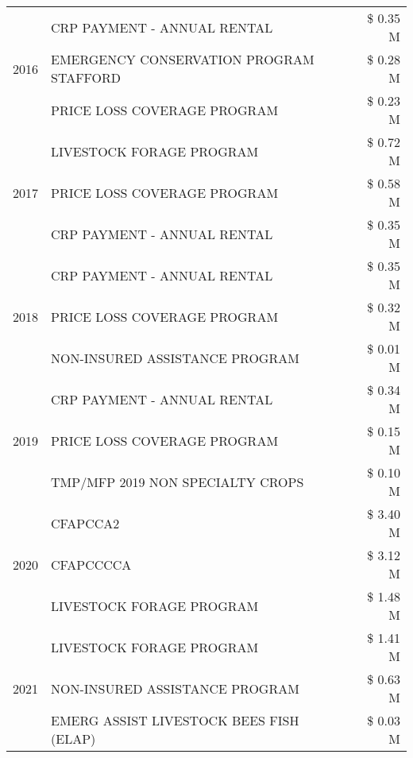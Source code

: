 \begin{tabular}{llr}
\cline{1-3}
\multirow[t]{3}{*}{2016} & CRP PAYMENT - ANNUAL RENTAL & \$ 0.35 M \\
 & EMERGENCY CONSERVATION PROGRAM STAFFORD & \$ 0.28 M \\
 & PRICE LOSS COVERAGE PROGRAM & \$ 0.23 M \\
\cline{1-3}
\multirow[t]{3}{*}{2017} & LIVESTOCK FORAGE PROGRAM & \$ 0.72 M \\
 & PRICE LOSS COVERAGE PROGRAM & \$ 0.58 M \\
 & CRP PAYMENT - ANNUAL RENTAL & \$ 0.35 M \\
\cline{1-3}
\multirow[t]{3}{*}{2018} & CRP PAYMENT - ANNUAL RENTAL & \$ 0.35 M \\
 & PRICE LOSS COVERAGE PROGRAM & \$ 0.32 M \\
 & NON-INSURED ASSISTANCE PROGRAM & \$ 0.01 M \\
\cline{1-3}
\multirow[t]{3}{*}{2019} & CRP PAYMENT - ANNUAL RENTAL & \$ 0.34 M \\
 & PRICE LOSS COVERAGE PROGRAM & \$ 0.15 M \\
 & TMP/MFP 2019 NON SPECIALTY CROPS & \$ 0.10 M \\
\cline{1-3}
\multirow[t]{3}{*}{2020} & CFAPCCA2 & \$ 3.40 M \\
 & CFAPCCCCA & \$ 3.12 M \\
 & LIVESTOCK FORAGE PROGRAM & \$ 1.48 M \\
\cline{1-3}
\multirow[t]{3}{*}{2021} & LIVESTOCK FORAGE PROGRAM & \$ 1.41 M \\
 & NON-INSURED ASSISTANCE PROGRAM & \$ 0.63 M \\
 & EMERG ASSIST LIVESTOCK BEES FISH (ELAP) & \$ 0.03 M \\
\cline{1-3}
\bottomrule
\end{tabular}
